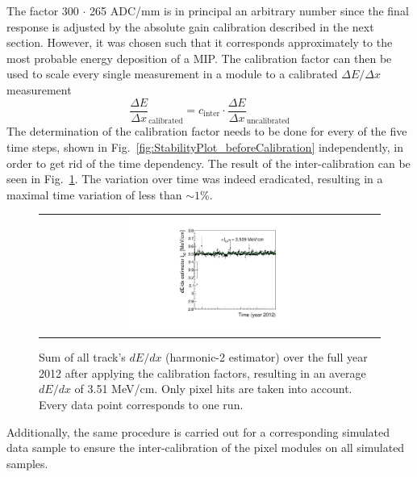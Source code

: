 The factor 300 $\cdot$ 265 ADC/mm is in principal an arbitrary number since the final response is adjusted by the absolute gain calibration described in the next section.
However, it was chosen such that it corresponds approximately to the most probable energy deposition of a MIP.
The calibration factor can then be used to scale every single measurement in a module to a calibrated $\Delta E/\Delta x$ measurement
\begin{equation*}
\frac{\Delta E}{\Delta x}_{\text{calibrated}}=c_{\text{inter}} \cdot \frac{\Delta E}{\Delta x}_{\text{uncalibrated}}
\end{equation*}
The determination of the calibration factor needs to be done for every of the five time steps, shown in Fig.~\ref{fig:StabilityPlot_beforeCalibration} independently, in order to get rid of the time dependency. 
The result of the inter-calibration can be seen in Fig.~\ref{fig:StabilityPlot_afterCalibration}.
The variation over time was indeed eradicated, resulting in a maximal time variation of less than $\sim1$\%.
\begin{figure}[!bt]
  \centering 
  \begin{tabular}{c}
  \includegraphics[width=0.49\textwidth]{figures/analysis/StabilityPlot_Pixel_afterCalibration_withoutStepFits_NEW.pdf}
  \end{tabular}
  \caption{Sum of all track's $dE/dx$ (harmonic-2 estimator) over the full year 2012 after applying the calibration factors, resulting in an average $dE/dx$ of 3.51 MeV/cm. Only pixel hits are taken into account. Every data point corresponds to one run.} 
  \label{fig:StabilityPlot_afterCalibration}
\end{figure}

Additionally, the same procedure is carried out for a corresponding simulated data sample to ensure the inter-calibration of the pixel modules on all simulated samples.




